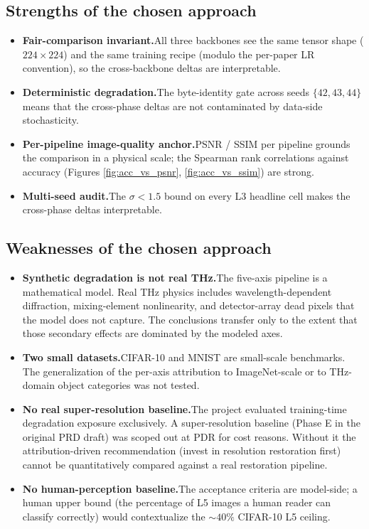 \subsection{Strengths of the chosen approach}
\begin{itemize}
  \item \textbf{Fair-comparison invariant.}\quad All three backbones see
        the same tensor shape ($224 \times 224$) and the same training
        recipe (modulo the per-paper LR convention), so the cross-backbone
        deltas are interpretable.
  \item \textbf{Deterministic degradation.}\quad The byte-identity gate
        across seeds $\{42, 43, 44\}$ means that the cross-phase deltas
        are not contaminated by data-side stochasticity.
  \item \textbf{Per-pipeline image-quality anchor.}\quad PSNR / SSIM
        per pipeline grounds the comparison in a physical scale; the
        Spearman rank correlations against accuracy (Figures
        \ref{fig:acc_vs_psnr}, \ref{fig:acc_vs_ssim}) are strong.
  \item \textbf{Multi-seed audit.}\quad The $\sigma < 1.5$ \Mpp{}
        bound on every L3 headline cell makes the cross-phase
        deltas interpretable.
\end{itemize}

\subsection{Weaknesses of the chosen approach}
\begin{itemize}
  \item \textbf{Synthetic degradation is not real THz.}\quad The
        five-axis pipeline is a mathematical model. Real THz physics
        includes wavelength-dependent diffraction, mixing-element
        nonlinearity, and detector-array dead pixels that the model
        does not capture. The conclusions transfer only to the extent
        that those secondary effects are dominated by the modeled
        axes.
  \item \textbf{Two small datasets.}\quad CIFAR-10 and MNIST are
        small-scale benchmarks. The generalization of the per-axis
        attribution to ImageNet-scale or to THz-domain object
        categories was not tested.
  \item \textbf{No real super-resolution baseline.}\quad The project
        evaluated training-time degradation exposure exclusively. A
        super-resolution baseline (Phase E in the original PRD draft)
        was scoped out at PDR for cost reasons. Without it the
        attribution-driven recommendation (invest in resolution
        restoration first) cannot be quantitatively compared
        against a real restoration pipeline.
  \item \textbf{No human-perception baseline.}\quad The acceptance
        criteria are model-side; a human upper bound (the percentage
        of L5 images a human reader can classify correctly) would
        contextualize the $\sim 40\%$ CIFAR-10 L5 ceiling.
\end{itemize}

